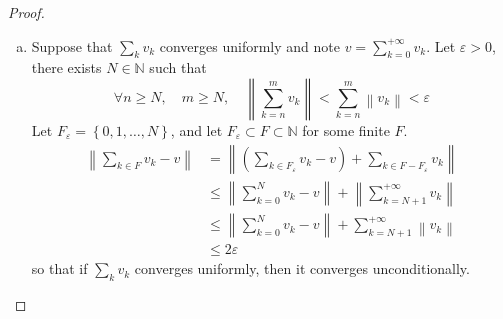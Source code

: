 \documentclass[11pt,a4paper,twoside]{article}
\theoremstyle{definition}
\begin{document}
\begin{proof}\hfill

  \begin{enumerate}[(a)]

  \item Suppose that $\sum_k v_k$ converges uniformly and note $v = \sum_{k = 0}^{+\infty} v_k$.
    Let $\varepsilon > 0$, there exists $N \in \mathbb{N}$ such that
    \begin{equation*}
      \forall n \geq N,\quad m \geq N,\quad \left\| \sum_{k = n}^{m} v_k \right\| < \sum_{k = n}^m \left\| v_k \right\| < \varepsilon
    \end{equation*}
    Let $F_\varepsilon = \left\{ 0, 1, \dotsc, N \right\}$, and let $F_\varepsilon \subset F \subset \mathbb{N}$ for some finite $F$.
    \begin{align*}
      \left\| \sum_{k \in F} v_k - v \right\| &= \left\| \left( \sum_{k \in F_\varepsilon} v_k - v \right) + \sum_{k \in F - F_\varepsilon} v_k \right\| \\
      &\leq \left\| \sum_{k = 0}^N v_k - v \right\| + \left\| \sum_{k = N + 1}^{+\infty} v_k \right\| \\
      &\leq \left\| \sum_{k = 0}^N v_k - v \right\| + \sum_{k = N + 1}^{+\infty} \left\| v_k \right\| \\
      &\leq 2 \varepsilon
    \end{align*}
    so that if $\sum_k v_k$ converges uniformly, then it converges unconditionally.


\end{enumerate}
\end{proof}
\end{document}
